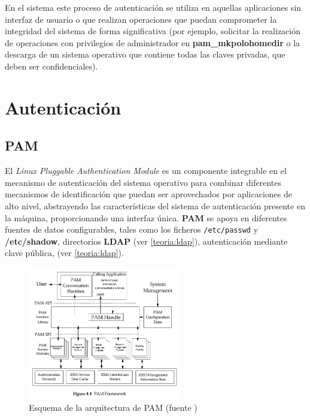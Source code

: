 En el sistema este proceso de autenticación se utiliza en aquellas aplicaciones sin interfaz de usuario o que realizan operaciones que puedan comprometer la integridad del sistema de forma significativa (por ejemplo, solicitar la realización de operaciones con privilegios de administrador en \textbf{pam\_mkpolohomedir} o la descarga de un sistema operativo que contiene todas las claves privadas, que deben ser confidenciales).

\section{Autenticación}
\subsection{PAM}

El \textit{Linux Pluggable Authentication Module}\cite{opengroup:rfc86.0} es un componente integrable en el mecanismo de autenticación del sistema operativo para combinar diferentes mecanismos de identificación que puedan ser aprovechados por aplicaciones de alto nivel, abstrayendo las características del sistema de autenticación presente en la máquina, proporcionando una interfaz única. \textbf{PAM} se apoya en diferentes fuentes de datos configurables, tales como los ficheros \texttt{/etc/passwd} y \textbf{/etc/shadow}, directorios \textbf{LDAP} (ver \ref{teoria:ldap}), autenticación mediante clave pública, (ver \ref{teoria:ldap}).

\begin{figure}[H]
\centering
  \immediate{}
  \includegraphics[width=0.6\textwidth]{Chapter2/Figures/pamstructure.png}
  \caption[Esquema de la arquitectura de PAM]{Esquema de la arquitectura de PAM (fuente \cite{opengroup:rfc86.0})}
\end{figure}

